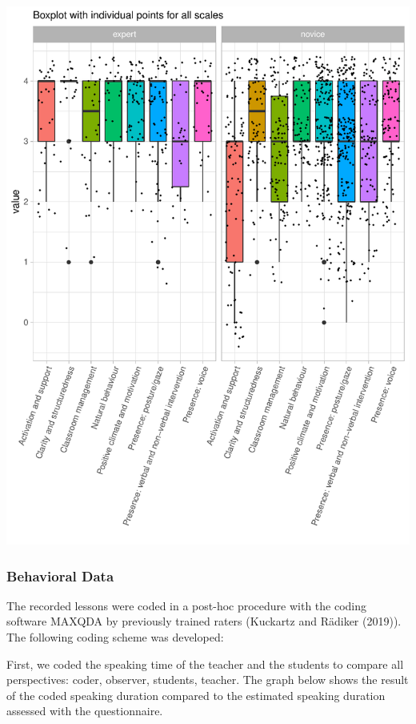 \documentclass[
  english,
  man,floatsintext]{apa6}
\begin{document}
\includegraphics{paper_1_supplement_files/figure-latex/boxplot scales-1.pdf}

\newpage

\hypertarget{behavioral-data-1}{%
\subsubsection{Behavioral Data}\label{behavioral-data-1}}

The recorded lessons were coded in a post-hoc procedure with the coding software MAXQDA by previously trained raters (Kuckartz and Rädiker (2019)). The following coding scheme was developed:

First, we coded the speaking time of the teacher and the students to compare all perspectives: coder, observer, students, teacher. The graph below shows the result of the coded speaking duration compared to the estimated speaking duration assessed with the questionnaire.
\end{document}

